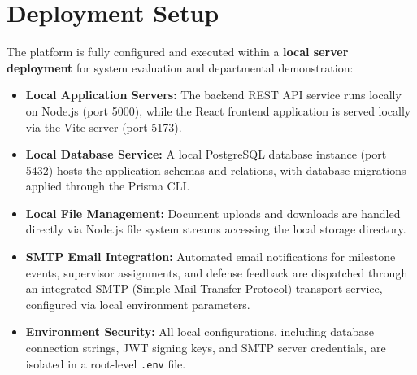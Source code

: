 \section{Deployment Setup}
The platform is fully configured and executed within a \textbf{local server deployment} for system evaluation and departmental demonstration:

\begin{itemize}
  \item \textbf{Local Application Servers:} The backend REST API service runs locally on Node.js (port 5000), while the React frontend application is served locally via the Vite server (port 5173).
  
  \item \textbf{Local Database Service:} A local PostgreSQL database instance (port 5432) hosts the application schemas and relations, with database migrations applied through the Prisma CLI.
  
  \item \textbf{Local File Management:} Document uploads and downloads are handled directly via Node.js file system streams accessing the local storage directory.
  
  \item \textbf{SMTP Email Integration:} Automated email notifications for milestone events, supervisor assignments, and defense feedback are dispatched through an integrated SMTP (Simple Mail Transfer Protocol) transport service, configured via local environment parameters.
  
  \item \textbf{Environment Security:} All local configurations, including database connection strings, JWT signing keys, and SMTP server credentials, are isolated in a root-level \texttt{.env} file.
\end{itemize}

